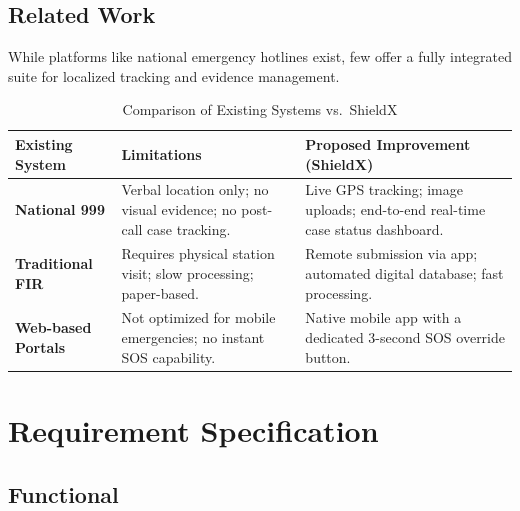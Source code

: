 \documentclass[12pt, a4paper, twoside, openany]{report}
\begin{document}
\section{Related Work}
While platforms like national emergency hotlines exist, few offer a fully integrated suite for localized tracking and evidence management.
\begin{table}[ht]
\centering
\caption{Comparison of Existing Systems vs.\ ShieldX}
\label{tab:comparison}
\begin{tabularx}{\textwidth}{p{3.5cm} X X}
\toprule
\textbf{Existing System} & \textbf{Limitations} & \textbf{Proposed Improvement (ShieldX)} \\
\midrule
\textbf{National 999} & Verbal location only; no visual evidence; no post-call case tracking. & Live GPS tracking; image uploads; end-to-end real-time case status dashboard. \\
\addlinespace
\textbf{Traditional FIR} & Requires physical station visit; slow processing; paper-based. & Remote submission via app; automated digital database; fast processing. \\
\addlinespace
\textbf{Web-based Portals} & Not optimized for mobile emergencies; no instant SOS capability. & Native mobile app with a dedicated 3-second SOS override button. \\
\bottomrule
\end{tabularx}
\end{table}
\chapter{Requirement Specification}
\section{Functional}
\end{document}
